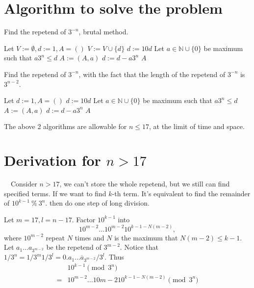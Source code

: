 \documentclass[paper=a4]{scrartcl}
\begin{document}
\section{Algorithm to solve the problem}
\begin{tcolorbox}[arc=0pt,colback=white,title={Algorithm}]
Find the repetend of $3^{-n}$, brutal method.
\tcblower
\begin{algorithmic}
\STATE Let $V:=\emptyset,d:=1,A=()$
	\STATE $V:=V\cup\{d\}$
    \STATE $d:=10d$
    \STATE Let $a\in\mathbb{N}\cup\{0\}$ be maximum such that $a3^n\leq d$
    \STATE $A:=(A,a)$
    \STATE $d:=d-a3^n$
\ENDWHILE 
\RETURN $A$
\end{algorithmic}
\end{tcolorbox}

\begin{tcolorbox}[arc=0pt,colback=white,title={Algorithm}]
Find the repetend of $3^{-n}$, with the fact that the length of the repetend of $3^{-n}$ is $3^{n-2}$.
\tcblower
\begin{algorithmic}
\STATE Let $d:=1,A=()$
    \STATE $d:=10d$
    \STATE Let $a\in\mathbb{N}\cup\{0\}$ be maximum such that $a3^n\leq d$
    \STATE $A:=(A,a)$
    \STATE $d:=d-a3^n$
\ENDFOR
\RETURN $A$
\end{algorithmic}
\end{tcolorbox}
The above 2 algorithms are allowable for $n\leq 17$, at the limit of time and space.

\section{Derivation for $n>17$}

\ \ Consider $n>17$, we can't store the whole repetend, but we still can find specified terms. If we want to find $k$-th term. It's equivalent to find the remainder of $10^{k-1}\ \%\ 3^n$. then do one step of long division.

Let $m=17,l=n-17$. Factor $10^{k-1}$ into \[10^{m-2}\ldots 10^{m-2}10^{k-1-N(m-2)},\] where $10^{m-2}$ repeat $N$ times and $N$ is the maximum that $N(m-2)\leq k-1$. Let $a_1\ldots a_{3^{m-2}}$ be the repetend of $3^{m-2}$. Notice that $1/3^n=1/3^m1/3^l=0.\overline{a_1\ldots a_{3^{m-2}}}/3^l$. Thus
\begin{equation}
\begin{split}
  & 10^{k-1} \pmod{3^n}\\
= & 10^{m-2}\ldots 10{m-2}10^{k-1-N(m-2)}\pmod{3^n}
\end{split}
\end{equation}

\begin{tcolorbox}[arc=0pt,colback=white,title={Definition}]

\end{tcolorbox}
\end{document}
